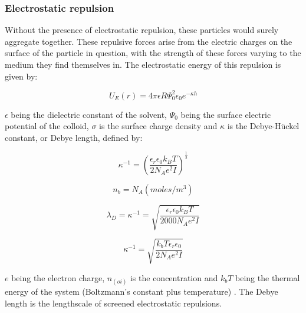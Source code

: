 \subsubsection{Electrostatic repulsion}


Without the presence of electrostatic repulsion, these particles would surely aggregate together. These repulsive forces arise from the electric charges on the surface of the particle in question, with the strength of these forces varying to the medium they find themselves in.\cite{?} The electrostatic energy of this repulsion is given by:

\begin{equation} %
U_E (r) = 4\pi\epsilon R \Psi^2_{0} \epsilon_0 e^{-\kappa h}
\end{equation}

$\epsilon$ being the dielectric constant of the solvent, $\Psi_0$ being the surface electric potential of the colloid, $\sigma$ is the surface charge density and $\kappa$ is the Debye-H\"uckel constant, or Debye length, defined by:

\begin{equation} %
\kappa^{-1} = \left(\frac{\epsilon_r \epsilon_0 k_B T}{2 N_A e^2 I}\right)^\frac{1}{2}
\label{eqn:debye} %
\end{equation} %

\begin{equation}
n_b = N_A (moles /m^3)
\end{equation}

\begin{equation}
\lambda_D = \kappa^{-1} = \sqrt{ \frac{ \epsilon_r \epsilon_0 k_B T}{2000N_A e^2 I}}
\end{equation} %

\begin{equation}
\kappa^{-1} = \sqrt{ \frac{ k_b T \epsilon_r \epsilon_0}{2 N_A e^2 I}}
\end{equation}

$e$ being the electron charge, $n_(oi)$ is the concentration and $k_bT$ being the thermal energy of the system (Boltzmann's constant plus temperature) \cite{boltzmann}. The Debye length is the lengthscale of screened electrostatic repulsions.\cite{?}



